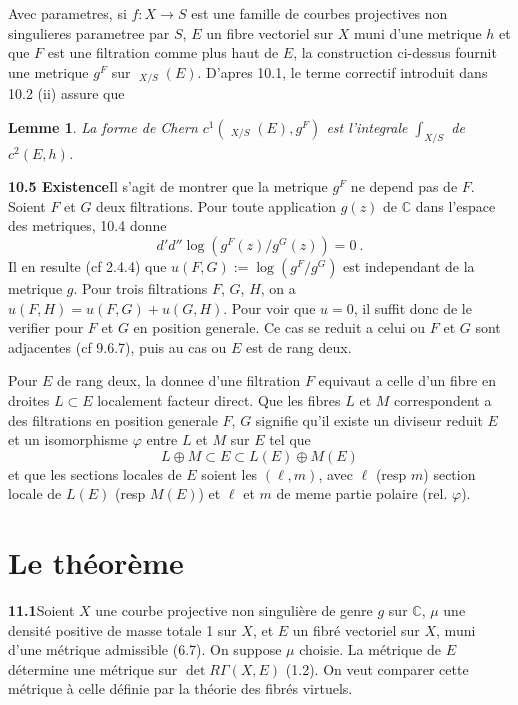 \documentclass[12pt,a4paper]{article}
\theoremstyle{plain}
\newtheorem{lemma}[theorem]{Lemme}
\theoremstyle{definition}
\theoremstyle{remark}
\newcommand{\bbC}{\mathbb{C}}
\DeclareMathOperator{\ICtwo}{IC_2}
\begin{document}
Avec parametres, si $f: X \to S$ est une famille de courbes projectives non singulieres parametree par $S$, $E$ un fibre vectoriel sur $X$ muni d'une metrique $h$ et que $F$ est une filtration comme plus haut de $E$, la construction ci-dessus fournit une metrique $g^F$ sur $\ICtwo_{X/S}(E)$. D'apres 10.1, le terme correctif introduit dans 10.2 (ii) assure que

\begin{lemma}
La forme de Chern $c^1(\ICtwo_{X/S}(E), g^F)$ est l'integrale $\int_{X/S}$ de $c^2(E, h)$.
\end{lemma}

\medskip
\noindent\textbf{10.5 Existence}\quad Il s'agit de montrer que la metrique $g^F$ ne depend pas de $F$. Soient $F$ et $G$ deux filtrations. Pour toute application $g(z)$ de $\bbC$ dans l'espace des metriques, 10.4 donne
\[
d'd'' \log(g^F(z)/g^G(z)) = 0 \ .
\]
Il en resulte (cf 2.4.4) que $u(F, G) := \log(g^F/g^G)$ est independant de la metrique $g$. Pour trois filtrations $F$, $G$, $H$, on a $u(F, H) = u(F, G) + u(G, H)$. Pour voir que $u = 0$, il suffit donc de le verifier pour $F$ et $G$ en position generale. Ce cas se reduit a celui ou $F$ et $G$ sont adjacentes (cf 9.6.7), puis au cas ou $E$ est de rang deux.

Pour $E$ de rang deux, la donnee d'une filtration $F$ equivaut a celle d'un fibre en droites $L \subset E$ localement facteur direct. Que les fibres $L$ et $M$ correspondent a des filtrations en position generale $F$, $G$ signifie qu'il existe un diviseur reduit $E$ et un isomorphisme $\varphi$ entre $L$ et $M$ sur $E$ tel que
\[
L \oplus M \subset E \subset L(E) \oplus M(E)
\]
et que les sections locales de $E$ soient les $(\ell, m)$, avec $\ell$ (resp $m$) section locale de $L(E)$ (resp $M(E)$) et $\ell$ et $m$ de meme partie polaire (rel. $\varphi$).


\section{Le th\'eor\`eme}

\noindent\textbf{11.1}\quad Soient $X$ une courbe projective non singuli\`ere de genre $g$ sur $\bbC$, $\mu$ une densit\'e positive de masse totale 1 sur $X$, et $E$ un fibr\'e vectoriel sur $X$, muni d'une m\'etrique admissible (6.7). On suppose $\mu$ choisie. La m\'etrique de $E$ d\'etermine une m\'etrique sur $\det R\Gamma(X, E)$ (1.2). On veut comparer cette m\'etrique \`a celle d\'efinie par la th\'eorie des fibr\'es virtuels.
\end{document}
